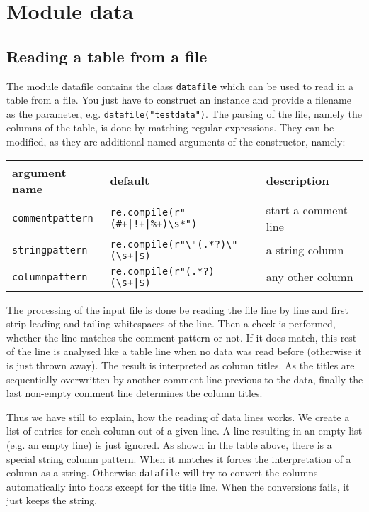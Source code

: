 \chapter{Module data}
\label{module:data}

\section{Reading a table from a file}

The module datafile contains the class \verb|datafile| which can be
used to read in a table from a file. You just have to construct an
instance and provide a filename as the parameter, e.g.
\verb|datafile("testdata")|. The parsing of the file, namely the
columns of the table, is done by matching regular expressions. They
can be modified, as they are additional named arguments of the
constructor, namely:

\medskip
\begin{tabularx}{\linewidth}{ll>{\raggedright\arraybackslash}X}
argument name&default&description\\
\hline
\texttt{commentpattern}&\texttt{re.compile(r"(\#+|!+|\%+)\textbackslash s*")}&start a comment line\\
\texttt{stringpattern}&\texttt{re.compile(r"\textbackslash"(.*?)\textbackslash"(\textbackslash s+|\$)}&a string column\\
\texttt{columnpattern}&\texttt{re.compile(r"(.*?)(\textbackslash s+|\$)}&any other column\\
\end{tabularx}
\medskip

The processing of the input file is done be reading the file line by
line and first strip leading and tailing whitespaces of the line. Then
a check is performed, whether the line matches the comment pattern or
not. If it does match, this rest of the line is analysed like a table
line when no data was read before (otherwise it is just thrown away).
The result is interpreted as column titles. As the titles are
sequentially overwritten by another comment line previous to the data,
finally the last non-empty comment line determines the column titles.

Thus we have still to explain, how the reading of data lines works. We
create a list of entries for each column out of a given line. A line
resulting in an empty list (e.g. an empty line) is just ignored. As
shown in the table above, there is a special string column pattern.
When it matches it forces the interpretation of a column as a string.
Otherwise \verb|datafile| will try to convert the columns
automatically into floats except for the title line. When the
conversions fails, it just keeps the string.

